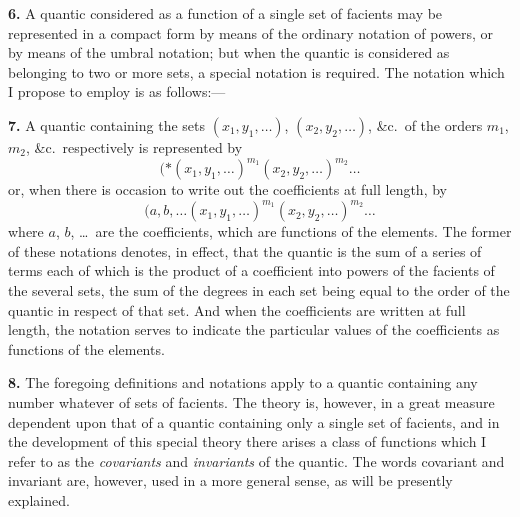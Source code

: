 \documentclass[11pt,a4paper]{book}
\begin{document}
\textbf{6.} A quantic considered as a function of a single set of facients may be represented in a compact form by means of the ordinary notation of powers, or by means of the umbral notation; but when the quantic is considered as belonging to two or more sets, a special notation is required. The notation which I propose to employ is as follows:---

\newpage
\setcounter{page}{224}

\textbf{7.} A quantic containing the sets $(x_1, y_1, \ldots)$, $(x_2, y_2, \ldots)$, \&c.\ of the orders $m_1$, $m_2$, \&c.\ respectively is represented by
\[
(*\!\!\!\!\!(x_1, y_1, \ldots)^{m_1} (x_2, y_2, \ldots)^{m_2} \ldots
\]
or, when there is occasion to write out the coefficients at full length, by
\[
(a, b, \ldots \!\!\!\!(x_1, y_1, \ldots)^{m_1} (x_2, y_2, \ldots)^{m_2} \ldots
\]
where $a$, $b$, \ldots\ are the coefficients, which are functions of the elements. The former of these notations denotes, in effect, that the quantic is the sum of a series of terms each of which is the product of a coefficient into powers of the facients of the several sets, the sum of the degrees in each set being equal to the order of the quantic in respect of that set. And when the coefficients are written at full length, the notation serves to indicate the particular values of the coefficients as functions of the elements.

\textbf{8.} The foregoing definitions and notations apply to a quantic containing any number whatever of sets of facients. The theory is, however, in a great measure dependent upon that of a quantic containing only a single set of facients, and in the development of this special theory there arises a class of functions which I refer to as the \textit{covariants} and \textit{invariants} of the quantic. The words covariant and invariant are, however, used in a more general sense, as will be presently explained.

\newpage
\setcounter{page}{225}
\end{document}
